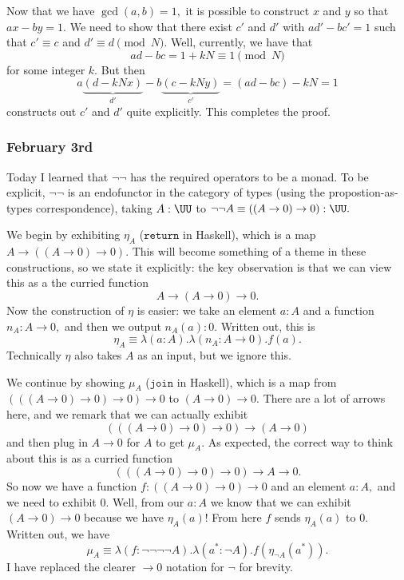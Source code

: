 Now that we have $\gcd(a,b)=1,$ it is possible to construct $x$ and $y$ so that $ax-by=1.$ We need to show that there exist $c'$ and $d'$ with $ad'-bc'=1$ such that $c'\equiv c$ and $d'\equiv d\pmod N.$ Well, currently, we have that
\[ad-bc=1+kN\equiv1\pmod N\]
for some integer $k.$ But then
\[a\underbrace{(d-kNx)}_{d'}-b\underbrace{(c-kNy)}_{c'}=(ad-bc)-kN=1\]
constructs out $c'$ and $d'$ quite explicitly. This completes the proof.

\subsubsection{February 3rd}
Today I learned that $\lnot\lnot$ has the required operators to be a monad. To be explicit, $\lnot\lnot$ is an endofunctor in the category of types (using the propostion-as-types correspondence), taking $A:\UU$ to $\lnot\lnot A\equiv((A\to0)\to0):\UU.$

We begin by exhibiting $\eta_A$ ($\texttt{return}$ in Haskell), which is a map $A\to((A\to0)\to0).$ This will become something of a theme in these constructions, so we state it explicitly: the key observation is that we can view this as a the curried function
\[A\to(A\to0)\to0.\]
Now the construction of $\eta$ is easier: we take an element $a:A$ and a function $n_A:A\to0,$ and then we output $n_A(a):0.$ Written out, this is
\[\eta_A\equiv\lambda(a:A).\lambda(n_A:A\to0).f(a).\]
Technically $\eta$ also takes $A$ as an input, but we ignore this.

We continue by showing $\mu_A$ ($\texttt{join}$ in Haskell), which is a map from $(((A\to0)\to0)\to0)\to0$ to $(A\to0)\to0.$ There are a lot of arrows here, and we remark that we can actually exhibit
\[(((A\to0)\to0)\to0)\to(A\to0)\]
and then plug in $A\to0$ for $A$ to get $\mu_A.$ As expected, the correct way to think about this is as a curried function
\[(((A\to0)\to0)\to0)\to A\to0.\]
So now we have a function $f:((A\to0)\to0)\to0$ and an element $a:A,$ and we need to exhibit $0.$ Well, from our $a:A$ we know that we can exhibit $(A\to0)\to0$ because we have $\eta_A(a)$! From here $f$ sends $\eta_A(a)$ to $0.$ Written out, we have
\[\mu_A\equiv\lambda(f:\lnot\lnot\lnot\lnot A).\lambda(a^*:\lnot A).f(\eta_{\lnot A}(a^*)).\]
I have replaced the clearer $\to0$ notation for $\lnot$ for brevity.

